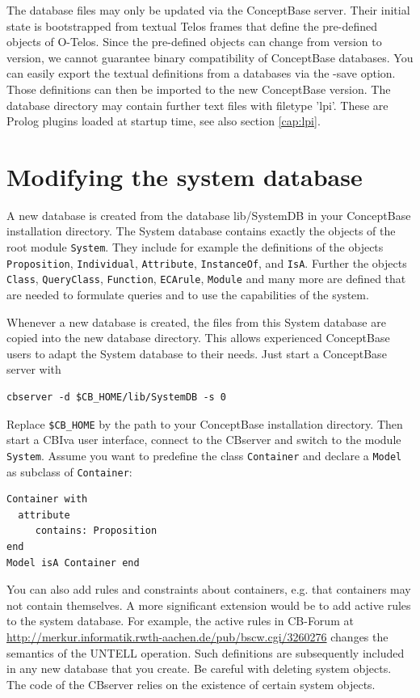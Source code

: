 The database files may only be updated via the ConceptBase server. Their
initial state is bootstrapped from textual Telos frames that define the
pre-defined objects of O-Telos.  Since the pre-defined objects can change
from version to version, we cannot guarantee binary compatibility of 
ConceptBase databases. You can easily export the textual definitions from
a databases via the -save option. Those definitions can then be 
imported to the new ConceptBase version.
The database directory may contain further text files with filetype 'lpi'. These are
Prolog plugins loaded at startup time, see also section \ref{cap:lpi}.


\section{Modifying the system database}

A new database is created from the database lib/SystemDB in your ConceptBase
installation directory. The System database contains exactly the objects
of the root module {\tt System}. They include for example the definitions
of the objects {\tt Proposition}, {\tt Individual},  {\tt Attribute},
 {\tt InstanceOf}, and  {\tt IsA}. Further the objects {\tt Class},
 {\tt QueryClass},  {\tt Function},  {\tt ECArule},  {\tt Module}
and many more are defined that are needed to formulate queries and
to use the capabilities of the system. 

Whenever a new database is created, the files from
this System database are copied into the new database directory. This allows experienced
ConceptBase users to adapt the System database to their needs. Just start a 
ConceptBase server with

\begin{verbatim}
cbserver -d $CB_HOME/lib/SystemDB -s 0
\end{verbatim}

Replace {\tt \$CB\_HOME} by the path to your ConceptBase installation directory.
Then start a CBIva user interface, connect to the CBserver and switch to the
module {\tt System}. Assume you want to predefine the class {\tt Container}
and declare a {\tt Model} as subclass of {\tt Container}:

\begin{verbatim}
Container with
  attribute
     contains: Proposition
end
Model isA Container end
\end{verbatim}

You can also add rules and constraints about containers, e.g. that containers
may not contain themselves.
A more significant extension would be to add active rules to the system database.
For example, the active rules
in CB-Forum at \url{http://merkur.informatik.rwth-aachen.de/pub/bscw.cgi/3260276}
changes the semantics of the UNTELL operation.
Such definitions are subsequently included in any new database that you create.
Be careful with deleting system objects. The code of the CBserver relies on
the existence of certain system objects. 


